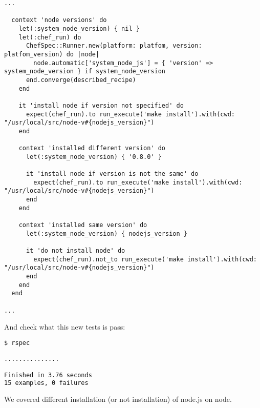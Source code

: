 \begin{lstlisting}[label=lst:testing-fauxhai2,title=my-server-cloud/site-cookbooks/my\_cool\_app/spec/unit/recipes/node\_spec.rb]
...

  context 'node versions' do
    let(:system_node_version) { nil }
    let(:chef_run) do
      ChefSpec::Runner.new(platform: platfom, version: platfom_version) do |node|
        node.automatic['system_node_js'] = { 'version' => system_node_version } if system_node_version
      end.converge(described_recipe)
    end

    it 'install node if version not specified' do
      expect(chef_run).to run_execute('make install').with(cwd: "/usr/local/src/node-v#{nodejs_version}")
    end

    context 'installed different version' do
      let(:system_node_version) { '0.8.0' }

      it 'install node if version is not the same' do
        expect(chef_run).to run_execute('make install').with(cwd: "/usr/local/src/node-v#{nodejs_version}")
      end
    end

    context 'installed same version' do
      let(:system_node_version) { nodejs_version }

      it 'do not install node' do
        expect(chef_run).not_to run_execute('make install').with(cwd: "/usr/local/src/node-v#{nodejs_version}")
      end
    end
  end

...
\end{lstlisting}

And check what this new tests is pass:

\begin{lstlisting}[language=Bash,label=lst:testing-fauxhai3]
$ rspec

...............

Finished in 3.76 seconds
15 examples, 0 failures
\end{lstlisting}

We covered different installation (or not installation) of node.js on node.